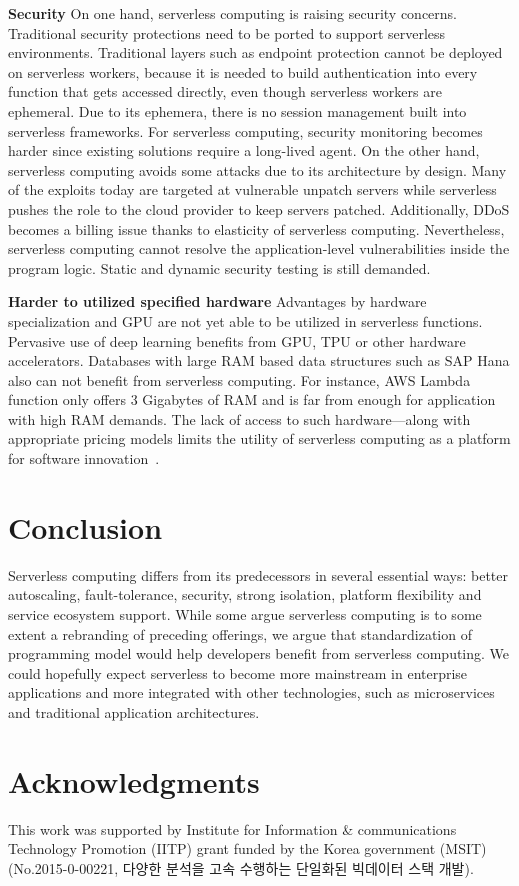 \documentclass{kcc}
\begin{document}
\textbf{Security} On one hand, serverless computing is raising security concerns. Traditional security protections need to be ported to support serverless environments. Traditional layers such as endpoint protection cannot be deployed on serverless workers, because it is needed to build authentication into every function that gets accessed directly, even though serverless workers are ephemeral. Due to its ephemera, there is no session management built into serverless frameworks. For serverless computing, security monitoring becomes harder since existing solutions require a long-lived agent. On the other hand, serverless computing avoids some attacks due to its architecture by design. Many of the exploits today are targeted at vulnerable unpatch servers while serverless pushes the role to the cloud provider to keep servers patched. Additionally, DDoS becomes a billing issue thanks to elasticity of serverless computing. Nevertheless, serverless computing cannot resolve the application-level vulnerabilities inside the program logic. Static and dynamic security testing is still demanded.

\textbf{Harder to utilized specified hardware} Advantages by hardware specialization and GPU are not yet able to be utilized in serverless functions. Pervasive use of deep learning benefits from GPU, TPU or other hardware accelerators. Databases with large RAM based data structures such as SAP Hana also can not benefit from serverless computing. For instance, AWS Lambda function only offers 3 Gigabytes of RAM and is far from enough for application with high RAM demands. The lack of access to such hardware—along with appropriate pricing models limits the utility of serverless computing as a platform for software innovation~\cite{Kubernetes:16}.

\section{Conclusion}

Serverless computing differs from its predecessors in several essential ways: better autoscaling, fault-tolerance, security, strong isolation, platform flexibility and service ecosystem support. While some argue serverless computing is to some extent a rebranding of preceding offerings, we argue that standardization of programming model would help developers benefit from serverless computing. We could hopefully expect serverless to become more mainstream in enterprise applications and more integrated with other technologies, such as microservices and traditional application architectures.

\section{Acknowledgments}

This work was supported by Institute for Information \& communications Technology Promotion (IITP) grant funded by the Korea government (MSIT) (No.2015-0-00221, 다양한 분석을 고속 수행하는 단일화된 빅데이터 스택 개발).



\end{document}
